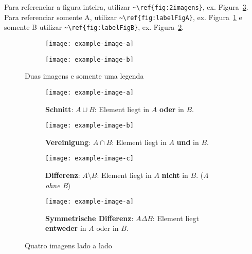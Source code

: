 Para referenciar a figura inteira, utilizar \verb|~\ref{fig:2imagens}|, ex. Figura~\ref{fig:2imagens}. Para referenciar somente A, utilizar \verb|~\ref{fig:labelFigA}|, ex. Figura~\ref{fig:labelFigA} e somente B utilizar \verb|~\ref{fig:labelFigB}|, ex. Figura~\ref{fig:labelFigB}.

\begin{figure}[!htp]
        \centering
        \begin{subfigure}[t]{0.4\textwidth}
                \texttt{[image: example-image-a]}
                \caption{} %
                \label{fig:labelFigA}
        \end{subfigure}       
        \begin{subfigure}[t]{0.4\textwidth}
                \texttt{[image: example-image-b]}
                \caption{}
                \label{fig:labelFigB}
        \end{subfigure}
        \caption{Duas imagens e somente uma legenda}\label{fig:2imagens}
\end{figure}


\begin{figure}
\centering
  \begin{subfigure}[t]{.4\textwidth}
    \centering
    \texttt{[image: example-image-a]}
    \caption{\textbf{Schnitt}: $A \cup B$: Element liegt in $A$ \textbf{oder} in $B$.}
  \end{subfigure}
  \begin{subfigure}[t]{.4\textwidth}
    \centering
    \texttt{[image: example-image-b]}
    \caption{\textbf{Vereinigung}: $A \cap B$: Element liegt in $A$ \textbf{und} in $B$.}
  \end{subfigure}
  \begin{subfigure}[t]{.4\textwidth}
    \centering
    \texttt{[image: example-image-c]}
    \caption{\textbf{Differenz}: $A \setminus B$: Element liegt in $A$ \textbf{nicht} in $B$. (\textit{A ohne B})}
  \end{subfigure}
  \begin{subfigure}[t]{.4\textwidth}
    \centering
    \texttt{[image: example-image-a]}
    \caption{\textbf{Symmetrische Differenz}: $A \Delta B$: Element liegt \textbf{entweder} in $A$ oder in $B$.}
  \end{subfigure}
  \caption{Quatro imagens lado a lado}\label{fig:4imagens} 
\end{figure}



